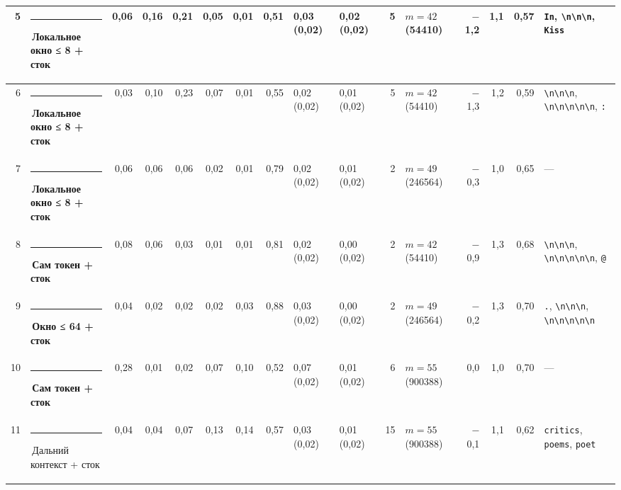 \documentclass[10pt]{article}
\begin{document}
\begin{minipage}{\linewidth}
\begin{center}
{\begin{tabular}{|r|l|r|r|r|r|r|r|l|l|r|l|r|r|r|l|}
5 & \textcolor[HTML]{1BAF7A}{\rule{0.62em}{0.62em}}\,\textbf{Локальное окно ≤ 8 + сток} & 0,06 & 0,16 & 0,21 & 0,05 & 0,01 & 0,51 & 0,03 (0,02) & 0,02 (0,02) & 5 & $m{=}42$ (54410) & $-$1,2 & 1,1 & 0,57 & \texttt{\textvisiblespace{}In}, \texttt{\textvisiblespace{}\textbackslash{}n\textbackslash{}n\textbackslash{}n}, \texttt{\textvisiblespace{}Kiss} \\ \hline
6 & \textcolor[HTML]{1BAF7A}{\rule{0.62em}{0.62em}}\,\textbf{Локальное окно ≤ 8 + сток} & 0,03 & 0,10 & 0,23 & 0,07 & 0,01 & 0,55 & 0,02 (0,02) & 0,01 (0,02) & 5 & $m{=}42$ (54410) & $-$1,3 & 1,2 & 0,59 & \texttt{\textvisiblespace{}\textbackslash{}n\textbackslash{}n\textbackslash{}n}, \texttt{\textvisiblespace{}\textbackslash{}n\textbackslash{}n\textbackslash{}n\textbackslash{}n\textbackslash{}n}, \texttt{\textvisiblespace{}:} \\ \hline
7 & \textcolor[HTML]{1BAF7A}{\rule{0.62em}{0.62em}}\,\textbf{Локальное окно ≤ 8 + сток} & 0,06 & 0,06 & 0,06 & 0,02 & 0,01 & 0,79 & 0,02 (0,02) & 0,01 (0,02) & 2 & $m{=}49$ (246564) & $-$0,3 & 1,0 & 0,65 & — \\ \hline
8 & \textcolor[HTML]{2A78D6}{\rule{0.62em}{0.62em}}\,\textbf{Сам токен + сток} & 0,08 & 0,06 & 0,03 & 0,01 & 0,01 & 0,81 & 0,02 (0,02) & 0,00 (0,02) & 2 & $m{=}42$ (54410) & $-$0,9 & 1,3 & 0,68 & \texttt{\textvisiblespace{}\textbackslash{}n\textbackslash{}n\textbackslash{}n}, \texttt{\textvisiblespace{}\textbackslash{}n\textbackslash{}n\textbackslash{}n\textbackslash{}n\textbackslash{}n}, \texttt{\textvisiblespace{}@} \\ \hline
9 & \textcolor[HTML]{EDA100}{\rule{0.62em}{0.62em}}\,\textbf{Окно ≤ 64 + сток} & 0,04 & 0,02 & 0,02 & 0,02 & 0,03 & 0,88 & 0,03 (0,02) & 0,00 (0,02) & 2 & $m{=}49$ (246564) & $-$0,2 & 1,3 & 0,70 & \texttt{\textvisiblespace{}.}, \texttt{\textvisiblespace{}\textbackslash{}n\textbackslash{}n\textbackslash{}n}, \texttt{\textvisiblespace{}\textbackslash{}n\textbackslash{}n\textbackslash{}n\textbackslash{}n\textbackslash{}n} \\ \hline
10 & \textcolor[HTML]{2A78D6}{\rule{0.62em}{0.62em}}\,\textbf{Сам токен + сток} & 0,28 & 0,01 & 0,02 & 0,07 & 0,10 & 0,52 & 0,07 (0,02) & 0,01 (0,02) & 6 & $m{=}55$ (900388) & 0,0 & 1,0 & 0,70 & — \\ \hline
11 & \textcolor[HTML]{C3C2B7}{\rule{0.62em}{0.62em}}\,Дальний контекст + сток & 0,04 & 0,04 & 0,07 & 0,13 & 0,14 & 0,57 & 0,03 (0,02) & 0,01 (0,02) & 15 & $m{=}55$ (900388) & $-$0,1 & 1,1 & 0,62 & \texttt{\textvisiblespace{}critics}, \texttt{\textvisiblespace{}poems}, \texttt{\textvisiblespace{}poet} \\ \hline

\end{tabular}}
\end{center}
\end{minipage}
\end{document}
